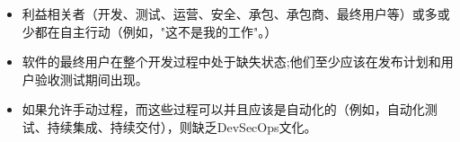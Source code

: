 \documentclass[UTF8, oneside]{ctexbook}
\begin{document}
\begin{paracol}{2}
\begin{rightcolumn}
\begin{itemize}
      \item 利益相关者（开发、测试、运营、安全、承包、承包商、最终用户等）或多或少都在自主行动（例如，"这不是我的工作"。）\footnotemark[2]
      \item 软件的最终用户在整个开发过程中处于缺失状态;他们至少应该在发布计划和用户验收测试期间出现。
      \item 如果允许手动过程，而这些过程可以并且应该是自动化的（例如，自动化测试、持续集成、持续交付），则缺乏DevSecOps文化。
    \end{itemize}
  \end{rightcolumn}
\end{paracol}
\end{document}
